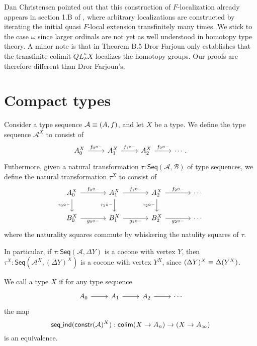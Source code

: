 Dan Christensen pointed out that this construction of $F$-localization already appears in section 1.B of \cite{Farjoun}, where arbitrary localizations are constructed by iterating the initial quasi $F$-local extension transfinitely many times. We stick to the case $\omega$ since larger ordinals are not yet as well understood in homotopy type theory. A minor note is that in Theorem B.5 Dror Farjoun only establishes that the transfinite colimit $QL_F^\kappa X$ localizes the homotopy groups. Our proofs are therefore different than Dror Farjoun's.

\section{Compact types}

\begin{defn}
Consider a type sequence $\mathcal{A}\equiv (A,f)$, and let $X$ be a type. We define the type sequence $\mathcal{A}^X$ to consist of
\begin{equation*}
\begin{tikzcd}
A_0^X \arrow[r,"f_0\circ \blank"] & A_1^X \arrow[r,"f_1\circ\blank"] & A_2^X \arrow[r,"f_2\circ\blank"] & \cdots. 
\end{tikzcd}
\end{equation*}
Futhermore, given a natural transformation $\tau:\mathsf{Seq}(\mathcal{A},\mathcal{B})$ of type sequences, we define the natural transformation $\tau^X$ to consist of
\begin{equation*}
\begin{tikzcd}[column sep=large]
A_0^X \arrow[r,"f_0\circ \blank"] \arrow[d,swap,"\tau_0\circ\blank"] & A_1^X \arrow[r,"f_1\circ\blank"] \arrow[d,swap,"\tau_1\circ\blank"] & A_2^X \arrow[r,"f_2\circ\blank"] \arrow[d,swap,"\tau_2\circ\blank"] & \cdots \\
B_0^X \arrow[r,swap,"g_0\circ \blank"] & B_1^X \arrow[r,swap,"g_1\circ\blank"] & B_2^X \arrow[r,swap,"g_2\circ\blank"] & \cdots
\end{tikzcd}
\end{equation*}
where the naturality squares commute by whiskering the natulity squares of $\tau$. 
\end{defn}

In particular, if $\tau:\mathsf{Seq}(\mathcal{A},\Delta Y)$ is a cocone with vertex $Y$, then $\tau^X :\mathsf{Seq}(\mathcal{A}^X,(\Delta Y)^X)$ is a cocone with vertex $Y^X$, since $(\Delta Y)^X \equiv \Delta (Y^X)$.  

\begin{defn}
We call a type $X$  if for any type sequence
\begin{equation*}
\begin{tikzcd}
A_0 \arrow[r] & A_1 \arrow[r] & A_2 \arrow[r] & \cdots
\end{tikzcd}
\end{equation*}
the map
\begin{equation*}
\mathsf{seq\underline{\ }{}ind}(\mathsf{constr}(\mathcal{A})^X)
  : \mathsf{colim}(X\to A_n)\to(X\to A_\infty)
\end{equation*}
is an equivalence.
\end{defn}


